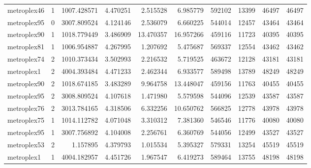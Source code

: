 \begin{longtable}{|l|r|r|r|r|r|r|r|r|r|}
metroplex46 & 1 & 1007.428571 & 4.470251 & 2.515528 & 6.985779 & 592102 & 13399 & 46497 & 46497 \\
metroplex95 & 0 & 3007.809524 & 4.124146 & 2.536079 & 6.660225 & 544014 & 12457 & 43464 & 43464 \\
metroplex90 & 1 & 1018.779449 & 3.486909 & 13.470357 & 16.957266 & 459116 & 11723 & 40395 & 40395 \\
metroplex81 & 1 & 1006.954887 & 4.267995 & 1.207692 & 5.475687 & 569337 & 12554 & 43462 & 43462 \\
metroplex74 & 2 & 1010.373434 & 3.502993 & 2.216532 & 5.719525 & 463672 & 12128 & 43181 & 43181 \\
metroplex1 & 2 & 4004.393484 & 4.471233 & 2.462344 & 6.933577 & 589498 & 13789 & 48249 & 48249 \\
metroplex90 & 2 & 1018.674185 & 3.483289 & 9.964758 & 13.448047 & 459156 & 11763 & 40455 & 40455 \\
metroplex95 & 2 & 3008.809524 & 4.107618 & 1.471980 & 5.579598 & 544096 & 12539 & 43587 & 43587 \\
metroplex76 & 2 & 3013.784165 & 4.318506 & 6.332256 & 10.650762 & 566825 & 12778 & 43978 & 43978 \\
metroplex75 & 1 & 1014.112782 & 4.071048 & 3.310312 & 7.381360 & 546546 & 11776 & 40080 & 40080 \\
metroplex95 & 1 & 3007.756892 & 4.104008 & 2.256761 & 6.360769 & 544056 & 12499 & 43527 & 43527 \\
metroplex53 & 2 & 1.157895 & 4.379793 & 1.015534 & 5.395327 & 579331 & 13254 & 45519 & 45519 \\
metroplex1 & 1 & 4004.182957 & 4.451726 & 1.967547 & 6.419273 & 589464 & 13755 & 48198 & 48198 \\
\end{longtable}
